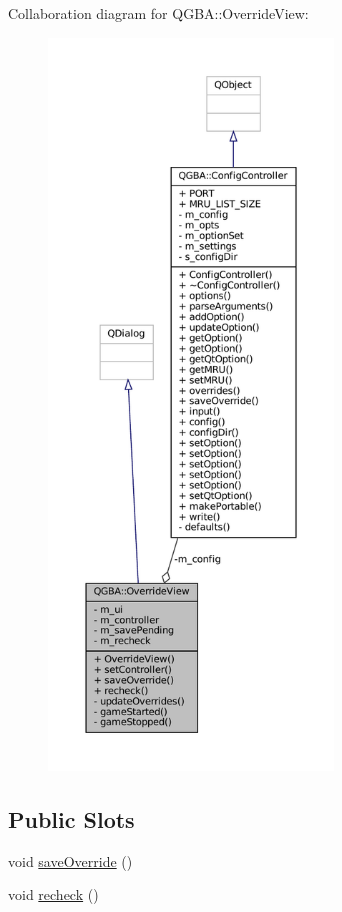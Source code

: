 Collaboration diagram for Q\+G\+BA\+:\+:Override\+View\+:
\nopagebreak
\begin{figure}[H]
\begin{center}
\leavevmode
\includegraphics[height=550pt]{class_q_g_b_a_1_1_override_view__coll__graph}
\end{center}
\end{figure}
\subsection*{Public Slots}
\begin{DoxyCompactItemize}
\item 
void \mbox{\hyperlink{class_q_g_b_a_1_1_override_view_a5f4267251191520565245e35ffeb54dd}{save\+Override}} ()
\item 
void \mbox{\hyperlink{class_q_g_b_a_1_1_override_view_ae0189dfd85dda5d45756da0344c09634}{recheck}} ()
\end{DoxyCompactItemize}
